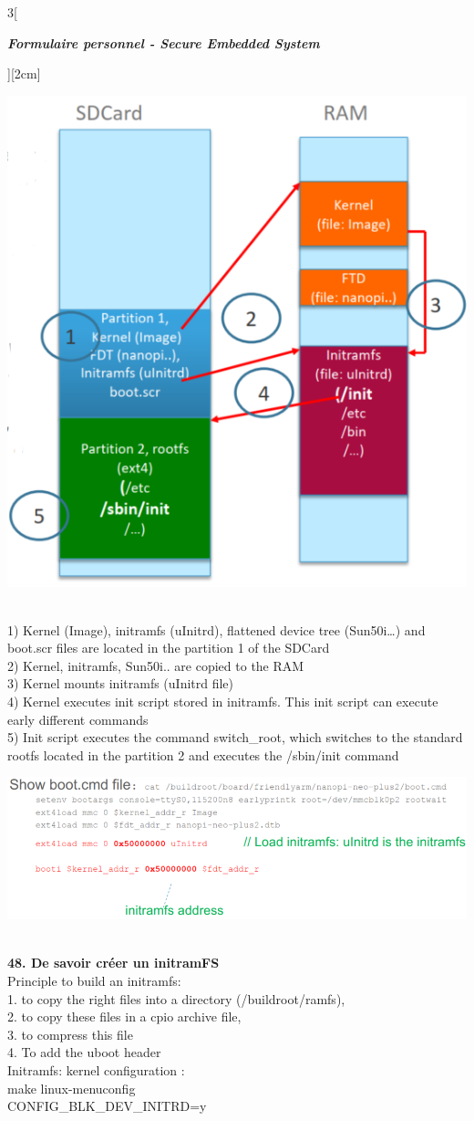 \begin{multicols}{3}[\centerline{ \large\em \textbf{Formulaire personnel - Secure Embedded System}}][2cm]
\begin{minipage}{\linewidth}
    \includegraphics[width =0.3\columnwidth]{images/39.png}
\end{minipage}\\
1) Kernel (Image), initramfs (uInitrd), flattened device tree (Sun50i…) and boot.scr files are located in the partition 1 of the SDCard\\
2) Kernel, initramfs, Sun50i.. are copied to the RAM\\
3) Kernel mounts initramfs (uInitrd file)\\
4) Kernel executes init script stored in initramfs. This init script can execute early different commands\\
5) Init script executes the command switch\_root, which switches to the standard rootfs located in the partition 2 and executes the /sbin/init
command
\begin{minipage}{\linewidth}
	\centering
    \includegraphics[width =\columnwidth]{images/40.png}
\end{minipage}
\\ \textbf{48. De savoir créer un initramFS\\}
Principle to build an initramfs:\\
1. to copy the right files into a directory (/buildroot/ramfs),\\
2. to copy these files in a cpio archive file,\\
3. to compress this file\\
4. To add the uboot header\\
Initramfs: kernel configuration :\\
make linux-menuconfig\\
CONFIG\_BLK\_DEV\_INITRD=y\\

\end{multicols}
